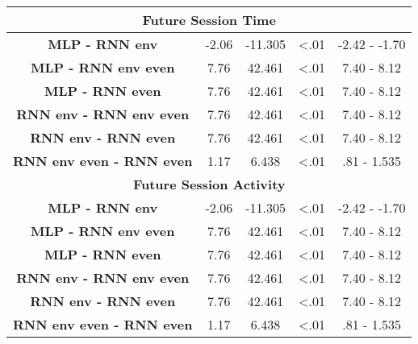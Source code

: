 \begin{table}[h]
\begin{tabular}{ccccc}
\multicolumn{5}{c}{\textbf{Future Session Time}}                                                                     \\ \hline
\textbf{MLP - RNN env} & -2.06                & -11.305     & \textless .01   & -2.42 - -1.70                     \\
\textbf{MLP - RNN env even}           & 7.76                & 42.461     & \textless .01   & 7.40 - 8.12                     \\
\textbf{MLP - RNN even}           & 7.76                & 42.461     & \textless .01   & 7.40 - 8.12                     \\
\textbf{RNN env - RNN env even}           & 7.76                & 42.461     & \textless .01   & 7.40 - 8.12                     \\
\textbf{RNN env - RNN even}           & 7.76                & 42.461     & \textless .01   & 7.40 - 8.12                     \\
\textbf{RNN env even - RNN even}          & 1.17                & 6.438     & \textless .01   & .81 - 1.535                    \\ \hline

\multicolumn{5}{c}{\textbf{Future Session Activity}}                                                                 \\ \hline
\textbf{MLP - RNN env} & -2.06                & -11.305     & \textless .01   & -2.42 - -1.70                     \\
\textbf{MLP - RNN env even}           & 7.76                & 42.461     & \textless .01   & 7.40 - 8.12                     \\
\textbf{MLP - RNN even}           & 7.76                & 42.461     & \textless .01   & 7.40 - 8.12                     \\
\textbf{RNN env - RNN env even}           & 7.76                & 42.461     & \textless .01   & 7.40 - 8.12                     \\
\textbf{RNN env - RNN even}           & 7.76                & 42.461     & \textless .01   & 7.40 - 8.12                     \\
\textbf{RNN env even - RNN even}          & 1.17                & 6.438     & \textless .01   & .81 - 1.535                    \\ \hline


\end{tabular}
\end{table}
